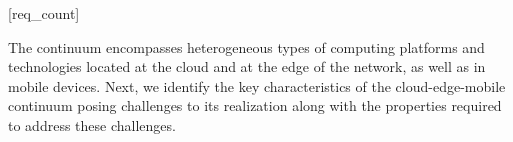 [req_count]



The continuum encompasses heterogeneous types of computing platforms and technologies located at the cloud and at the edge of the network, as well as in mobile devices. Next, we identify the key characteristics of the cloud-edge-mobile continuum posing challenges to its realization along with the properties required to address these challenges.








